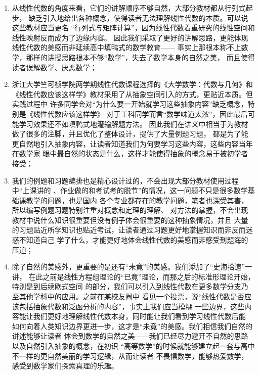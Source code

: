 \begin{enumerate}
    \item 从线性代数的角度来看，它们的讲解顺序不够自然，大部分教材都从行列式起步，
    缺乏引入地给出各种概念，使得读者无法理解线性代数的本质。可以说这些教材应当更名
    ``行列式与矩阵计算''，因为线性代数着重研究的线性空间和线性映射反而成为了边缘内容。
    因此我们采取了更好的讲解思路，更能体现线性代数的美感而非延续高中填鸭式的数学教育——
    事实上那根本称不上数学，那样的讲授思路根本不够``数学''，失去了数学本身的自然之美，
    而且使得读者误解数学、厌恶数学；
    \item 浙江大学竺可桢学院两学期线性代数课程选择的《大学数学：代数与几何》和
    《线性代数应该这样学》教材采用了从抽象空间引入的方式，更贴近本质。但实践过程中
    许多同学会对``为什么要一开始就学习这些抽象内容''缺乏概念，特别是《线性代数应该这样学》
    对于工科同学而言``数学味道太浓''，因此最后可能学习效果还不如填鸭式地灌输解题方法。
    因此我们在讲义中相当于为教材做了很多的注脚，并且优化了整体设计，提供了大量例题习题，
    都是为了能更自然地引入抽象内容，让读者知道我们为何要学习这些内容，这些内容当年在数学家
    眼中最自然的状态是什么，这样才能使得抽象的概念易于被初学者接受；
    \item 我们的例题和习题编排也是精心设计过的，不会出现大部分教材使用过程中``上课讲的
    、作业做的和考试考的脱节''的情况，这一问题不只是很多数学基础课教学的问题，也是国内
    各个专业都存在的教学问题，笔者也深受其害，所以编写例题习题特别注重对概念和定理的理解、
    对方法的掌握，不会出现教材中说什么知识很重要但没有例子体会很重要的这种抽象情况，并且
    大量的习题贴近所学知识也贴近考试，让读者通过习题更好地掌握知识而非反而迷惑不知道自己
    学了什么，才能更好地体会线性代数的美感而非感受到题海的压迫；
    \item 除了自然的美感外，更重要的是还有``未竟''的美感。我们添加了``史海拾遗''一讲，
    在此之前是线性方程组理论的``已竟''理论，而那之后的标准形理论开始，特别是到后续欧式空间
    的部分，我们可以引入到线性代数在更多数学分支乃至其他学科中的应用。之前在某校友圈中
    看见一个投票，说``线性代数是否应该包括抽象代数和泛函分析的内容''，事实上我们应当模糊
    一些边界，这些内容能让我们更好地理解线性代数本身，同时能让我们看到学习线性代数后能
    如何向着人类知识边界更进一步，这才是``未竟''的美感。我们相信我们自然的讲述能够让读者
    体会到数学的自然之美——我们已经尽力避开不自然的思路以及自然引入抽象的概念，在初识
    ``高等数学''的时候就能够建立起一套与高中不一样的更自然美丽的学习逻辑，从而让读者
    不畏惧数学，能够热爱数学，感受到数学家们探索真理的乐趣。
\end{enumerate}

